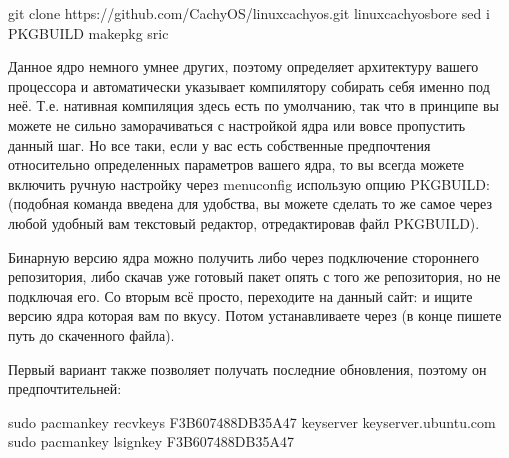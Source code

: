 \documentclass[letterpaper,10pt,russian,openany]{sphinxmanual}
\begin{document}
\begin{sphinxVerbatim}[commandchars=\\\{\}]
git clone https://github.com/CachyOS/linux\PYGZhy{}cachyos.git  
 linux\PYGZhy{}cachyos\PYGZhy{}bore 
sed \PYGZhy{}i  PKGBUILD 
makepkg \PYGZhy{}sric
\end{sphinxVerbatim}

\sphinxAtStartPar
Данное ядро немного умнее других, поэтому определяет архитектуру вашего процессора
и автоматически указывает компилятору собирать себя именно под неё. Т.е. нативная
компиляция здесь есть по умолчанию, так что в принципе вы можете не сильно заморачиваться
с настройкой ядра или вовсе пропустить данный шаг. Но все таки, если у вас есть собственные
предпочтения относительно определенных параметров вашего ядра, то вы всегда можете включить ручную настройку
через menuconfig использую опцию PKGBUILD: 
(подобная команда введена для удобства, вы можете сделать то же самое через любой удобный вам
текстовый редактор, отредактировав файл PKGBUILD).

\sphinxAtStartPar
{}

\sphinxAtStartPar
Бинарную версию ядра можно получить либо через подключение стороннего репозитория,
либо скачав уже готовый пакет опять с того же репозитория, но не подключая его.
Со вторым всё просто, переходите на данный сайт:  и ищите
версию ядра которая вам по вкусу. Потом устанавливаете через  (в конце пишете путь до скаченного файла).

\sphinxAtStartPar
Первый вариант также позволяет получать последние обновления, поэтому он предпочтительней:

\begin{sphinxVerbatim}[commandchars=\\\{\}]
sudo pacman\PYGZhy{}key \PYGZhy{}\PYGZhy{}recv\PYGZhy{}keys F3B607488DB35A47 \PYGZhy{}\PYGZhy{}keyserver keyserver.ubuntu.com
sudo pacman\PYGZhy{}key \PYGZhy{}\PYGZhy{}lsign\PYGZhy{}key F3B607488DB35A47
\end{sphinxVerbatim}
\end{document}
